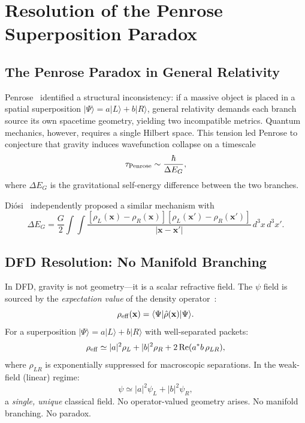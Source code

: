 \documentclass[aps,prd,twocolumn,superscriptaddress,nofootinbib]{revtex4-2}
\begin{document}
\section{Resolution of the Penrose Superposition Paradox}
\label{sec:penrose}

\subsection{The Penrose Paradox in General Relativity}

Penrose~\cite{Penrose1996,Penrose2014} identified a structural
inconsistency: if a massive object is placed in a spatial superposition
$|\Psi\rangle = a|L\rangle + b|R\rangle$, general relativity demands
each branch source its own spacetime geometry, yielding two incompatible
metrics. Quantum mechanics, however, requires a single Hilbert space.
This tension led Penrose to conjecture that gravity induces wavefunction
collapse on a timescale
\begin{equation}\label{eq:penrose-time}
\tau_{\rm Penrose} \sim \frac{\hbar}{\Delta E_G},
\end{equation}
where $\Delta E_G$ is the gravitational self-energy difference between
the two branches.

Di\'osi~\cite{Diosi1989} independently proposed a similar mechanism
with
\begin{equation}\label{eq:diosi}
\Delta E_G = \frac{G}{2}\int\!\!\int
\frac{[\rho_L(\mathbf{x}) - \rho_R(\mathbf{x})]
[\rho_L(\mathbf{x}') - \rho_R(\mathbf{x}')]}{|\mathbf{x} - \mathbf{x}'|}
\,d^3x\,d^3x'.
\end{equation}

\subsection{DFD Resolution: No Manifold Branching}

In DFD, gravity is not geometry---it is a scalar refractive field. The
$\psi$ field is sourced by the \emph{expectation value} of the density
operator~\cite{Alcock2025Penrose}:
\begin{equation}
\rho_{\rm eff}(\mathbf{x}) = \langle\Psi|\hat{\rho}(\mathbf{x})|\Psi\rangle.
\end{equation}
For a superposition $|\Psi\rangle = a|L\rangle + b|R\rangle$ with
well-separated packets:
\begin{equation}
\rho_{\rm eff} \simeq |a|^2\rho_L + |b|^2\rho_R + 2\,\mathrm{Re}
(a^*b\,\rho_{LR}),
\end{equation}
where $\rho_{LR}$ is exponentially suppressed for macroscopic
separations. In the weak-field (linear) regime:
\begin{equation}\label{eq:convex-sum}
\psi \simeq |a|^2\psi_L + |b|^2\psi_R,
\end{equation}
a \emph{single, unique} classical field. No operator-valued geometry
arises. No manifold branching. No paradox.
\end{document}

